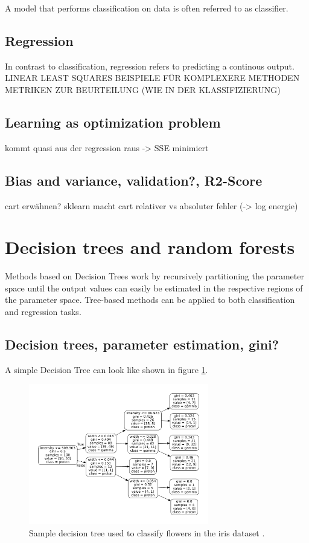 A model that performs classification on data is often referred to as
classifier.

\subsection{Regression}
In contrast to classification, regression refers to predicting
a continous output.
LINEAR LEAST SQUARES
BEISPIELE FÜR KOMPLEXERE METHODEN
METRIKEN ZUR BEURTEILUNG (WIE IN DER KLASSIFIZIERUNG)


\subsection{Learning as optimization problem}
kommt quasi aus der regression raus -> SSE minimiert
\subsection{Bias and variance, validation?, R2-Score}



cart erwähnen? sklearn macht cart
relativer vs absoluter fehler (-> log energie)
\section{Decision trees and random forests}
Methods based on Decision Trees work by recursively partitioning
the parameter space until the output values can easily be estimated
in the respective regions of the parameter space.
Tree-based methods can be applied to both classification and regression tasks.

\subsection{Decision trees, parameter estimation, gini?}
A simple Decision Tree can look like shown in figure \ref{fig:03_tree}.

\begin{figure}
  \centering
  \includegraphics[width=0.7\textwidth]{Plots/decision_tree.pdf}
  \caption{Sample decision tree used to classify flowers in
  the iris dataset \cite{fisher1936use} \cite{sklearn}.}
  \label{fig:03_tree}
\end{figure}

